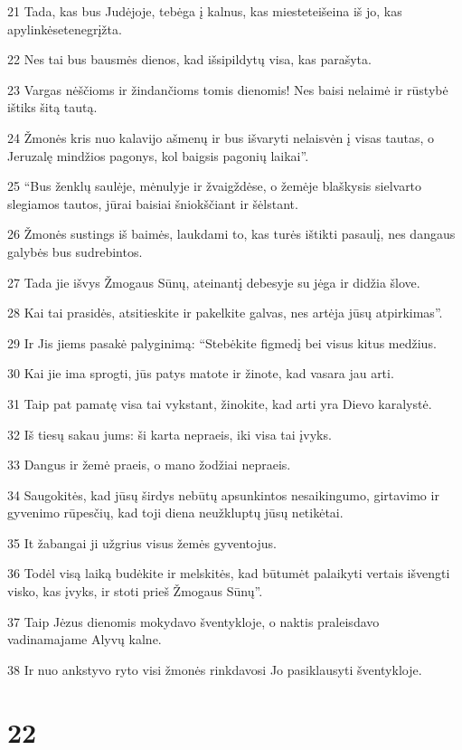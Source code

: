 \par 21 Tada, kas bus Judėjoje, tebėga į kalnus, kas mieste­teišeina iš jo, kas apylinkėse­tenegrįžta. 
\par 22 Nes tai bus bausmės dienos, kad išsipildytų visa, kas parašyta. 
\par 23 Vargas nėščioms ir žindančioms tomis dienomis! Nes baisi nelaimė ir rūstybė ištiks šitą tautą. 
\par 24 Žmonės kris nuo kalavijo ašmenų ir bus išvaryti nelaisvėn į visas tautas, o Jeruzalę mindžios pagonys, kol baigsis pagonių laikai”. 
\par 25 “Bus ženklų saulėje, mėnulyje ir žvaigždėse, o žemėje blaškysis sielvarto slegiamos tautos, jūrai baisiai šniokščiant ir šėlstant. 
\par 26 Žmonės sustings iš baimės, laukdami to, kas turės ištikti pasaulį, nes dangaus galybės bus sudrebintos. 
\par 27 Tada jie išvys Žmogaus Sūnų, ateinantį debesyje su jėga ir didžia šlove. 
\par 28 Kai tai prasidės, atsitieskite ir pakelkite galvas, nes artėja jūsų atpirkimas”. 
\par 29 Ir Jis jiems pasakė palyginimą: “Stebėkite figmedį bei visus kitus medžius. 
\par 30 Kai jie ima sprogti, jūs patys matote ir žinote, kad vasara jau arti. 
\par 31 Taip pat pamatę visa tai vykstant, žinokite, kad arti yra Dievo karalystė. 
\par 32 Iš tiesų sakau jums: ši karta nepraeis, iki visa tai įvyks. 
\par 33 Dangus ir žemė praeis, o mano žodžiai nepraeis. 
\par 34 Saugokitės, kad jūsų širdys nebūtų apsunkintos nesaikingumo, girtavimo ir gyvenimo rūpesčių, kad toji diena neužkluptų jūsų netikėtai. 
\par 35 It žabangai ji užgrius visus žemės gyventojus. 
\par 36 Todėl visą laiką budėkite ir melskitės, kad būtumėt palaikyti vertais išvengti visko, kas įvyks, ir stoti prieš Žmogaus Sūnų”. 
\par 37 Taip Jėzus dienomis mokydavo šventykloje, o naktis praleisdavo vadinamajame Alyvų kalne. 
\par 38 Ir nuo ankstyvo ryto visi žmonės rinkdavosi Jo pasiklausyti šventykloje.



\chapter{22}


